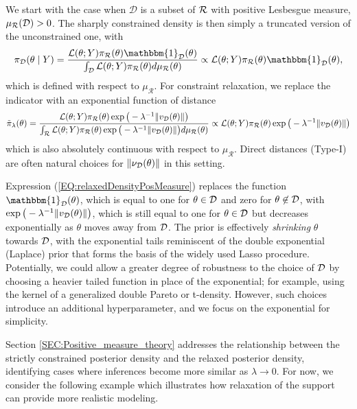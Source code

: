 \documentclass[10pt,fleqn]{article}
\DeclareMathOperator{\1}{\mathbbm{1}} \DeclareMathOperator{\bigO}{\mc O}
\begin{document}
We start with
the case when $\mathcal{D}$ is a subset of $\mathcal{R}$ with positive Lesbesgue measure, $\mu_\mathcal{R}(\mathcal{D})>0$.  The sharply constrained density is then simply a truncated version of the unconstrained one, with
$$\pi_\mathcal{D}(\theta\mid Y) = \frac{\mathcal{L}(\theta; Y)
\pi_\mathcal{R}(\theta)\mathbbm{1}_\mathcal{D}(\theta)}{\int_\mathcal{D}
\mathcal{L}(\theta; Y)
\pi_\mathcal{R}(\theta)d\mu_\mathcal{R}(\theta)}\propto \mathcal{L}(\theta;
Y) \pi_\mathcal{R}(\theta)\mathbbm{1}_\mathcal{D}(\theta), $$
which is defined with respect to $\mu_\mathcal{R}$. 
For constraint relaxation, we replace the indicator with an exponential function of distance
\begin{equation}
\label{EQ:relaxedDensityPosMeasure}
\tilde{\pi}_\lambda(\theta ) =
\frac{\mathcal{L}(\theta;
Y)\pi_\mathcal{R}(\theta)\exp\big(-
\lambda^{-1}{\|v_{\mathcal{D}}(\theta)\|}\big)}{\int_{\mathcal{R}}\mathcal{L}(\theta; Y)
\pi_\mathcal{R}(\theta)\exp\big(-{\lambda^{-1}}{\|v_{\mathcal{D}}(\theta)\|}\big)
d\mu_\mathcal{R}(\theta)} \propto
\mathcal{L}(\theta; Y)
\pi_\mathcal{R}(\theta)\exp\big(-{\lambda^{-1}}{\|v_{\mathcal{D}}(\theta)\|}\big)
\end{equation}
which is also absolutely continuous with respect to $\mu_\mathcal{R}.$  Direct distances (Type-I) are often natural choices for $\|\nu_{\mathcal{D}}(\theta)\|$ in this setting. 

Expression (\ref{EQ:relaxedDensityPosMeasure}) replaces the function $\mathbbm{1}_\mathcal{D}(\theta)$, which is equal to one for $\theta \in \mathcal{D}$ and zero for $\theta \not \in \mathcal{D}$, with 
$\exp\big(-{\lambda^{-1}}{\|v_{\mathcal{D}}(\theta)\|}\big)$, which is still equal to one for $\theta \in \mathcal{D}$ but decreases exponentially as $\theta$ moves away from $\mathcal{D}$.  The prior is effectively {\em shrinking} 
$\theta$ towards $\mathcal{D}$, with the exponential tails reminiscent of the double exponential (Laplace) prior that forms the basis of the widely used Lasso procedure.  Potentially, we could allow a greater degree of robustness to the choice of $\mathcal{D}$ by choosing a heavier tailed function in place of the exponential; for example, using the kernel of a generalized double Pareto or t-density.  However, such choices introduce an additional hyperparameter, and we focus on the exponential for simplicity.  

Section \ref{SEC:Positive_measure_theory} addresses the relationship between the strictly constrained posterior density and the relaxed posterior density, identifying cases where inferences become more similar as $\lambda \to 0$.  For now, we consider the following example which illustrates how relaxation of the support can provide more realistic modeling.   
\end{document}
